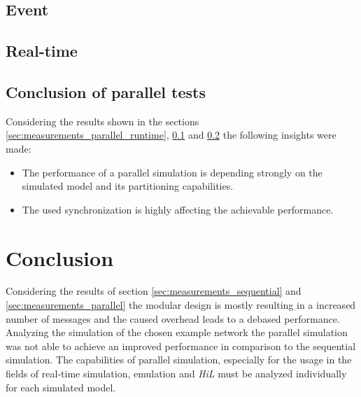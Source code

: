 \subsection{Event}
\label{sec:measurements_parallel_event}


\subsection{Real-time}
\label{sec:measurements_parallel_realtime}

\subsection{Conclusion of parallel tests}

Considering the results shown in the sections \ref{sec:measurements_parallel_runtime}, \ref{sec:measurements_parallel_event} and \ref{sec:measurements_parallel_realtime} the following insights were made:

\begin{itemize}
    \item The performance of a parallel simulation is depending strongly on the simulated model and its partitioning capabilities.
    \item The used synchronization is highly affecting the achievable performance.
\end{itemize}

\section{Conclusion}
Considering the results of section \ref{sec:measurements_sequential} and \ref{sec:measurements_parallel} the modular design is mostly resulting in a increased number of messages and the caused overhead leads to a debased performance.
Analyzing the simulation of the chosen example network the parallel simulation was not able to achieve an improved performance in comparison to the sequential simulation.
The capabilities of parallel simulation, especially for the usage in the fields of real-time simulation, emulation and \emph{HiL} must be analyzed individually for each simulated model. 